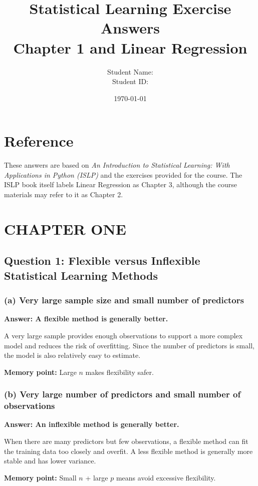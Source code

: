 \documentclass[12pt,a4paper]{article}
\title{\textbf{Statistical Learning Exercise Answers}\\
\large Chapter 1 and Linear Regression}
\author{Student Name: \underline{\hspace{6cm}}\\
Student ID: \underline{\hspace{6cm}}}
\date{\today}
\begin{document}
\maketitle

\section*{Reference}
These answers are based on \textit{An Introduction to Statistical Learning:
With Applications in Python (ISLP)} and the exercises provided for the
course. The ISLP book itself labels Linear Regression as Chapter 3, although
the course materials may refer to it as Chapter 2.

\section*{CHAPTER ONE}

\subsection*{Question 1: Flexible versus Inflexible Statistical Learning Methods}

\subsubsection*{(a) Very large sample size and small number of predictors}

\textbf{Answer: A flexible method is generally better.}

A very large sample provides enough observations to support a more complex
model and reduces the risk of overfitting. Since the number of predictors is
small, the model is also relatively easy to estimate.

\textbf{Memory point:} Large $n$ makes flexibility safer.

\subsubsection*{(b) Very large number of predictors and small number of observations}

\textbf{Answer: An inflexible method is generally better.}

When there are many predictors but few observations, a flexible method can
fit the training data too closely and overfit. A less flexible method is
generally more stable and has lower variance.

\textbf{Memory point:} Small $n$ + large $p$ means avoid excessive flexibility.
\end{document}
